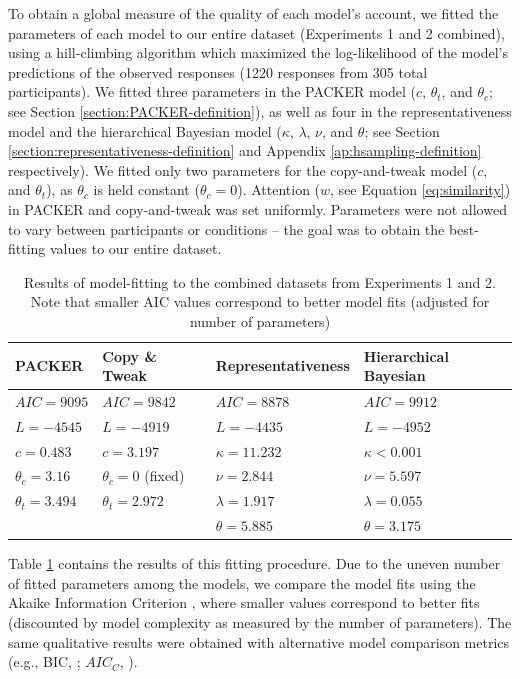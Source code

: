 \documentclass[12pt]{article}
\begin{document}
\begin{flushleft}
To obtain a global measure of the quality of each model's account, we fitted the
parameters of each model to our entire dataset (Experiments 1 and 2 combined),
using a hill-climbing algorithm which maximized the log-likelihood of the
model's predictions of the observed responses (1220 responses from 305 total
participants). We fitted three parameters in the PACKER model ($c$, $\theta_t$,
and $\theta_c$; see Section \ref{section:PACKER-definition}), as well as four in
the representativeness model and the hierarchical Bayesian model ($\kappa$,
$\lambda$, $\nu$, and $\theta$; see Section
\ref{section:representativeness-definition} and Appendix
\ref{ap:hsampling-definition} respectively). We fitted only two parameters for
the copy-and-tweak model ($c$, and $\theta_t$), as $\theta_c$ is held constant
($\theta_c = 0$). Attention ($w$, see Equation \ref{eq:similarity}) in PACKER
and copy-and-tweak was set uniformly. Parameters were not allowed to vary
between participants or conditions -- the goal was to obtain the best-fitting
values to our entire dataset.

\begin{table} \centering
\caption{Results of model-fitting to the combined datasets from Experiments 1
and 2. Note that smaller AIC values correspond to better model fits (adjusted
for number of parameters)}
\label{table:global-model-fits}
\begin{tabular}{ l l l l} \\ \textbf{PACKER} & \textbf{Copy \& Tweak} &
\textbf{Representativeness} & \textbf{Hierarchical Bayesian} \\ \hline $AIC =
  9095$ & $AIC = 9842$ & $AIC = 8878$ &  $AIC =
9912$ \\ $L = -4545$ & $L = -4919$ & $L = -4435$ & $L = -4952$ \\ $c = 0.483$ &
                                                                                $c = 3.197$ & $\kappa = 11.232$ &
$\kappa < 0.001$ \\ $\theta_c = 3.16$ & $\theta_c = 0$ (fixed) & $\nu = 2.844$ & $\nu = 5.597$ \\
$\theta_t = 3.494$ & $\theta_t = 2.972$ & $\lambda = 1.917$& $\lambda
                                                                       = 0.055$
  \\ & &$\theta = 5.885 $& $\theta = 3.175$
\\
\end{tabular}
\end{table}


Table \ref{table:global-model-fits} contains the results of this fitting
procedure. Due to the uneven number of fitted parameters among the models, we
compare the model fits using the Akaike Information Criterion
\citep[AIC;][]{akaike1974new}, where smaller values correspond to better fits
(discounted by model complexity as measured by the number of parameters). The
same qualitative results were obtained with alternative model comparison metrics
(e.g., BIC, \citealp{schwarz1978estimating}; $AIC_C$,
\citealp{hurvich1989regression}).


\end{flushleft}
\end{document}
